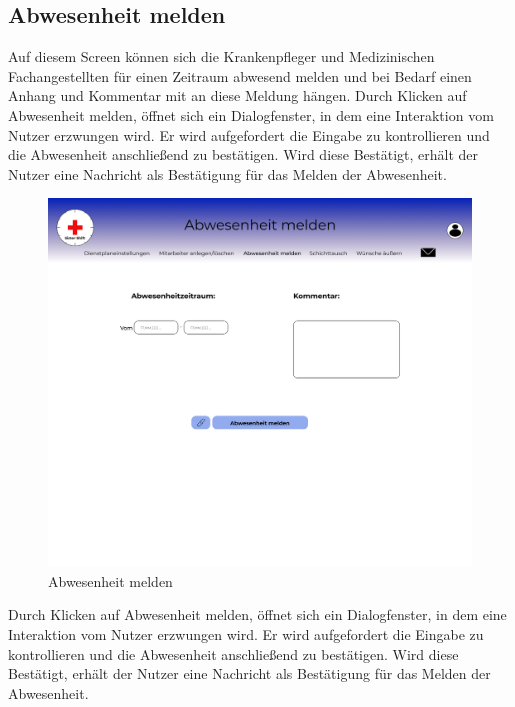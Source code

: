 \documentclass[11pt,
paper=a4,
bibtotocnumbered,	  %
liststotocnumbered,  %
DIV=calc,		  %
tablecaptionabove,	  %
headinclude,
]{article}
\begin{document}
\subsection{Abwesenheit melden}
Auf diesem Screen können sich die Krankenpfleger und Medizinischen Fachangestellten für einen Zeitraum abwesend melden und bei Bedarf einen Anhang und Kommentar mit an diese Meldung hängen.
Durch Klicken auf Abwesenheit melden, öffnet sich ein Dialogfenster, in dem eine Interaktion vom Nutzer erzwungen wird. Er wird aufgefordert die Eingabe zu kontrollieren und die Abwesenheit anschließend zu bestätigen. Wird diese Bestätigt, erhält der Nutzer eine Nachricht als Bestätigung für das Melden der Abwesenheit.
\begin{figure}[H]
\includegraphics[width=1\textwidth]{Bilder/Screens/Abwesenheitmelden.jpg}{\centering}
\caption{Abwesenheit melden}
\end{figure}
Durch Klicken auf Abwesenheit melden, öffnet sich ein Dialogfenster, in dem eine Interaktion vom Nutzer erzwungen wird. Er wird aufgefordert die Eingabe zu kontrollieren und die Abwesenheit anschließend zu bestätigen. Wird diese Bestätigt, erhält der Nutzer eine Nachricht als Bestätigung für das Melden der Abwesenheit.
\end{document}
